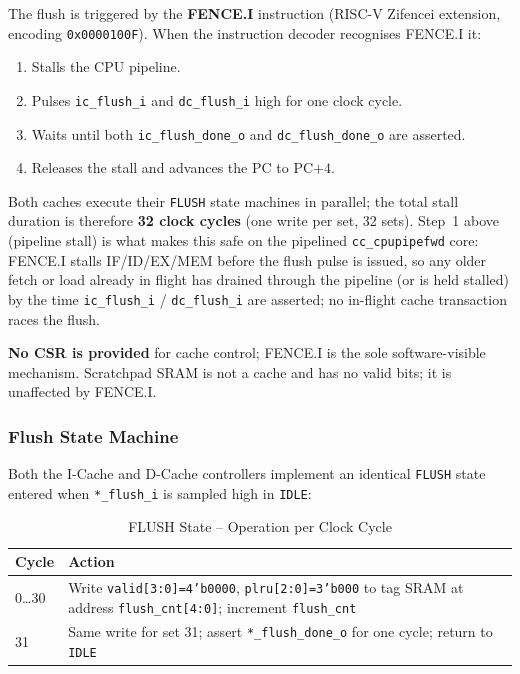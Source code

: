 The flush is triggered by the \textbf{FENCE.I} instruction
(RISC-V Zifencei extension, encoding \texttt{0x0000100F}).
When the instruction decoder recognises FENCE.I it:

\begin{enumerate}
  \item Stalls the CPU pipeline.
  \item Pulses \texttt{ic\_flush\_i} and \texttt{dc\_flush\_i} high for
    one clock cycle.
  \item Waits until both \texttt{ic\_flush\_done\_o} and
    \texttt{dc\_flush\_done\_o} are asserted.
  \item Releases the stall and advances the PC to PC$+4$.
\end{enumerate}

Both caches execute their \texttt{FLUSH} state machines in parallel;
the total stall duration is therefore \textbf{32 clock cycles}
(one write per set, 32 sets).
Step~1 above (pipeline stall) is what makes this safe on the pipelined
\texttt{cc\_cpupipefwd} core: FENCE.I stalls IF/ID/EX/MEM before the flush
pulse is issued, so any older fetch or load already in flight has drained
through the pipeline (or is held stalled) by the time \texttt{ic\_flush\_i}
/ \texttt{dc\_flush\_i} are asserted; no in-flight cache transaction races
the flush.

\textbf{No CSR is provided} for cache control; FENCE.I is the sole
software-visible mechanism.
Scratchpad SRAM is not a cache and has no valid bits; it is unaffected
by FENCE.I.

\subsubsection{Flush State Machine}

Both the I-Cache and D-Cache controllers implement an identical
\texttt{FLUSH} state entered when \texttt{*\_flush\_i} is sampled high
in \texttt{IDLE}:

\begin{table}[H]
\caption{FLUSH State -- Operation per Clock Cycle}
\label{tab:asFlushFsm}
\centering
\begin{tabularx}{\textwidth}{|l |X|}
  \hline
  Cycle & Action \\
  \hline
  \hline
  0\ldots30 & Write \texttt{valid[3:0]=4'b0000}, \texttt{plru[2:0]=3'b000}
              to tag SRAM at address \texttt{flush\_cnt[4:0]}; increment
              \texttt{flush\_cnt} \\
  \hline
  31        & Same write for set 31; assert \texttt{*\_flush\_done\_o} for
              one cycle; return to \texttt{IDLE} \\
  \hline
\end{tabularx}
\end{table}

